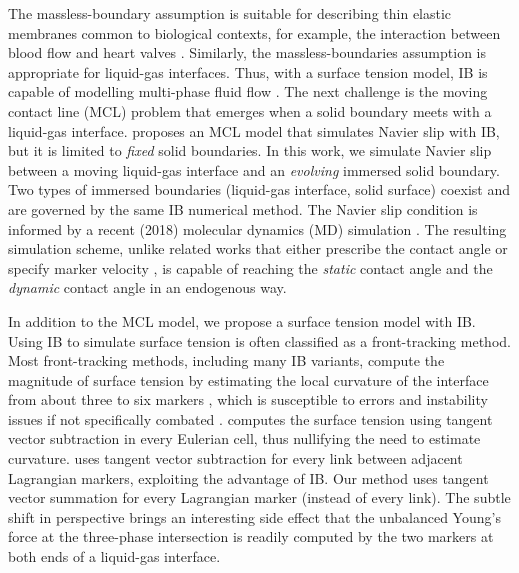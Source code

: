 \documentclass{jfm}
\begin{document}
The massless-boundary assumption is suitable for describing thin elastic membranes common to biological contexts, for example, the interaction between blood flow and heart valves \cite{peskin1972flow}. Similarly, the massless-boundaries assumption is appropriate for liquid-gas interfaces. Thus, with a surface tension model, IB is capable of modelling multi-phase fluid flow \cite{surface_tension_review, surface_tension_IB_estimates_curvature, multi_phase_2018, assessment_VOF_vs_IB}. The next challenge is the moving contact line (MCL) problem that emerges when a solid boundary meets with a liquid-gas interface. \cite{MCL_IBM_surfactant} proposes an MCL model that simulates Navier slip with IB, but it is limited to \textit{fixed} solid boundaries. In this work, we simulate Navier slip between a moving liquid-gas interface and an \textit{evolving} immersed solid boundary. Two types of immersed boundaries (liquid-gas interface, solid surface) coexist and are governed by the same IB numerical method. The Navier slip condition is informed by a recent (2018) molecular dynamics (MD) simulation \cite{MD_2018_its_the_bonds}. The resulting simulation scheme, unlike related works that either prescribe the contact angle \cite{curved_solid_DI_IB, muradoglu2010front} or specify marker velocity \cite{manservisi2009variational}, is capable of reaching the \textit{static} contact angle and the \textit{dynamic} contact angle in an endogenous way. 

In addition to the MCL model, we propose a surface tension model with IB. Using IB to simulate surface tension is often classified as a front-tracking method. Most front-tracking methods, including many IB variants, compute the magnitude of surface tension by estimating the local curvature of the interface from about three to six markers \cite{surface_tension_IB_estimates_curvature, multi_phase_2018}, which is susceptible to errors and instability issues if not specifically combated \cite{assessment_VOF_vs_IB}. \cite{surface_tension_still_tangent_applied_to_segment} computes the surface tension using tangent vector subtraction in every Eulerian cell, thus nullifying the need to estimate curvature. \cite{eulerian_tension_lagrangian_advection} uses tangent vector subtraction for every link between adjacent Lagrangian markers, exploiting the advantage of IB. Our method uses tangent vector summation for every Lagrangian marker (instead of every link). The subtle shift in perspective brings an interesting side effect that the unbalanced Young's force at the three-phase intersection is readily computed by the two markers at both ends of a liquid-gas interface. 
\end{document}
